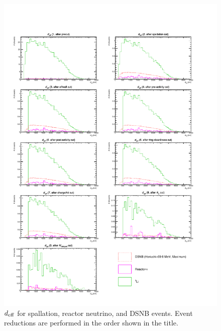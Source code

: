 \begin{figure}[h]
	\centering
	\includegraphics[width=15cm]{PDF/Dist_Nuebar/Che_50deg_tag_ge1/effwall}
	\caption[$d_{\rm eff}$ for spallation, reactor neutrino, and DSNB events]{
	$d_{\rm eff}$ for spallation, reactor neutrino, and DSNB events.
	Event reductions are performed in the order shown in the title.
	}\label{Nuebar_effwall}
\end{figure}

